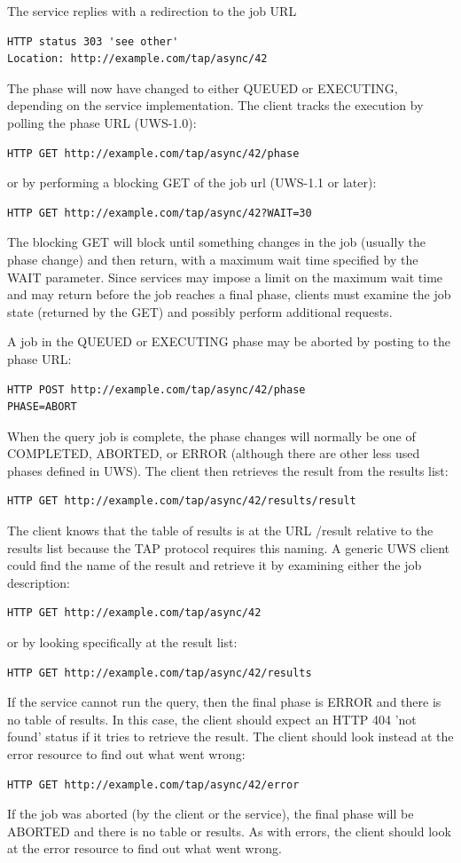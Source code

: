 \documentclass[11pt,letter]{ivoa}
\begin{document}
The service replies with a redirection to the job URL
\begin{verbatim}
HTTP status 303 'see other'
Location: http://example.com/tap/async/42
\end{verbatim}
The phase will now have changed to either QUEUED or EXECUTING, depending on the 
service implementation. The client tracks the execution by polling the phase 
URL (UWS-1.0):
\begin{verbatim}
HTTP GET http://example.com/tap/async/42/phase
\end{verbatim}
or by performing a blocking GET of the job url (UWS-1.1 or later):
\begin{verbatim}
HTTP GET http://example.com/tap/async/42?WAIT=30
\end{verbatim}
The blocking GET will block until something changes in the job (usually the phase
change) and then return, with a maximum wait time specified by the WAIT parameter. Since
services may impose a limit on the maximum wait time and may return before the job reaches
a final phase, clients must examine the job state (returned by the GET) and possibly perform
additional requests.

A job in the  QUEUED or EXECUTING phase may be aborted by posting to the phase 
URL:
\begin{verbatim}
HTTP POST http://example.com/tap/async/42/phase
PHASE=ABORT
\end{verbatim}

When the query job is complete, the phase changes will normally be one of 
COMPLETED, ABORTED, or ERROR (although there are other less used phases defined 
in UWS). The client then retrieves the result from the results list:
\begin{verbatim}
HTTP GET http://example.com/tap/async/42/results/result
\end{verbatim}
The client knows that the table of results is at the URL /result relative to the 
results list because the TAP protocol requires this naming. A generic UWS client 
could find the name of the result and retrieve it by examining either the job 
description:
\begin{verbatim}
HTTP GET http://example.com/tap/async/42
\end{verbatim}
or by looking specifically at the result list:
\begin{verbatim}
HTTP GET http://example.com/tap/async/42/results
\end{verbatim}
If the service cannot run the query, then the final phase is ERROR and there is 
no table of results. In this case, the client should expect an HTTP 404 'not 
found' status if it tries to retrieve the result. The client should look instead 
at the error resource to find out what went wrong:
\begin{verbatim}
HTTP GET http://example.com/tap/async/42/error
\end{verbatim}
If the job was aborted (by the client or the service), the final phase will be 
ABORTED and there is no table or results. As with errors, the client should look 
at the error resource to find out what went wrong.
\end{document}
